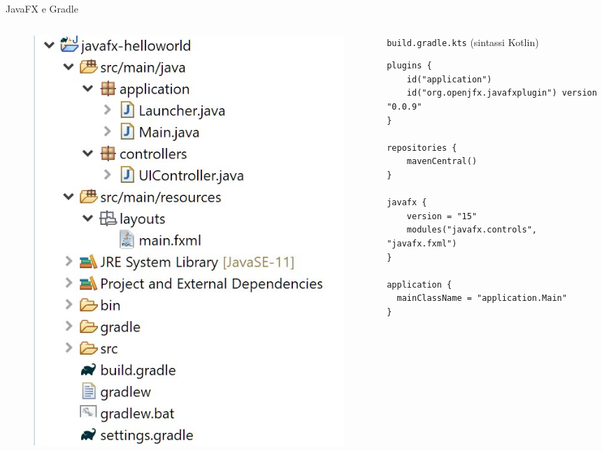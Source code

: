 \documentclass[presentation]{beamer}
\begin{document}
\begin{frame}[fragile]{JavaFX e Gradle}
\begin{columns}[t]
\begin{column}{0.3\textwidth}
\begin{figure}
\includegraphics[width=\textwidth]{img/javafx-gradle-project.png}
\end{figure}
\end{column}
\begin{column}{0.7\textwidth}
\begin{block}{\texttt{build.gradle.kts} (sintassi Kotlin)}

\begin{lstlisting}[basicstyle=\tiny]
plugins {
    id("application")
    id("org.openjfx.javafxplugin") version "0.0.9"
}

repositories {
    mavenCentral()
}

javafx {
    version = "15"
    modules("javafx.controls", "javafx.fxml")
}

application {
  mainClassName = "application.Main"
}
\end{lstlisting}

\end{block}
\end{column}
\end{columns}
\end{frame}
\end{document}
